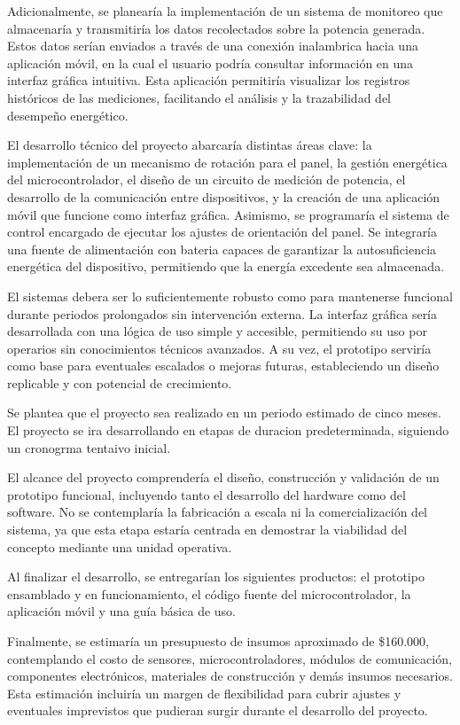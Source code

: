 \documentclass[a4paper,12pt]{article}
\begin{document}
Adicionalmente, se planearía la implementación de un sistema de monitoreo que almacenaría y transmitiría los datos recolectados sobre la potencia generada. Estos datos serían enviados a través de una conexión inalambrica hacia una aplicación móvil, en la cual el usuario podría consultar información en una interfaz gráfica intuitiva. Esta aplicación permitiría visualizar los registros históricos de las mediciones, facilitando el análisis y la trazabilidad del desempeño energético.

El desarrollo técnico del proyecto abarcaría distintas áreas clave: la implementación de un mecanismo de rotación para el panel, la gestión energética del microcontrolador, el diseño de un circuito de medición de potencia, el desarrollo de la comunicación entre dispositivos, y la creación de una aplicación móvil que funcione como interfaz gráfica. Asimismo, se programaría el sistema de control encargado de ejecutar los ajustes de orientación del panel. Se integraría una fuente de alimentación con bateria capaces de garantizar la autosuficiencia energética del dispositivo, permitiendo que la energía excedente sea almacenada.

El sistemas debera ser lo suficientemente robusto como para mantenerse funcional durante periodos prolongados sin intervención externa. La interfaz gráfica sería desarrollada con una lógica de uso simple y accesible, permitiendo su uso por operarios sin conocimientos técnicos avanzados. A su vez, el prototipo serviría como base para eventuales escalados o mejoras futuras, estableciendo un diseño replicable y con potencial de crecimiento.

Se plantea que el proyecto sea realizado en un periodo estimado de cinco meses. El proyecto se ira desarrollando en etapas de duracion predeterminada, siguiendo un cronogrma tentaivo inicial.

El alcance del proyecto comprendería el diseño, construcción y validación de un prototipo funcional, incluyendo tanto el desarrollo del hardware como del software. No se contemplaría la fabricación a escala ni la comercialización del sistema, ya que esta etapa estaría centrada en demostrar la viabilidad del concepto mediante una unidad operativa.

Al finalizar el desarrollo, se entregarían los siguientes productos: el prototipo ensamblado y en funcionamiento, el código fuente del microcontrolador, la aplicación móvil y una guía básica de uso.

Finalmente, se estimaría un presupuesto de insumos aproximado de \$160.000, contemplando el costo de sensores, microcontroladores, módulos de comunicación, componentes electrónicos, materiales de construcción y demás insumos necesarios. Esta estimación incluiría un margen de flexibilidad para cubrir ajustes y eventuales imprevistos que pudieran surgir durante el desarrollo del proyecto.
\end{document}
